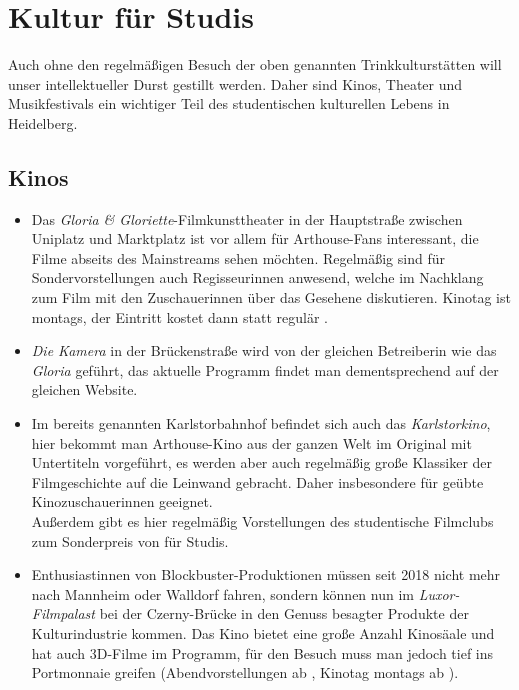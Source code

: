 
\section{Kultur für Studis}

Auch ohne den regelmäßigen Besuch der oben genannten Trinkkulturstätten will unser intellektueller Durst gestillt werden. Daher sind Kinos, Theater und Musikfestivals ein wichtiger Teil des studentischen kulturellen Lebens in Heidelberg.

\subsection{Kinos}
\begin{itemize}
\item Das \emph{Gloria \& Gloriette}-Filmkunsttheater in der Hauptstraße zwischen Uniplatz und Marktplatz ist vor allem für Arthouse-Fans interessant, die Filme abseits des Mainstreams sehen möchten. Regelmäßig sind für Sondervorstellungen auch Regisseurinnen anwesend, welche im Nachklang zum Film mit den Zuschauerinnen über das Gesehene diskutieren. Kinotag ist montags, der Eintritt kostet dann  statt regulär .
\item \emph{Die Kamera} in der Brückenstraße wird von der gleichen Betreiberin wie das \emph{Gloria} geführt, das aktuelle Programm findet man dementsprechend auf der gleichen Website.
\item Im bereits genannten Karlstorbahnhof befindet sich auch das \emph{Karlstorkino}, hier bekommt man Arthouse-Kino aus der ganzen Welt im Original mit Untertiteln vorgeführt, es werden aber auch regelmäßig große Klassiker der Filmgeschichte auf die Leinwand gebracht. Daher insbesondere für geübte Kinozuschauerinnen geeignet.\\
Außerdem gibt es hier regelmäßig Vorstellungen des studentische Filmclubs zum Sonderpreis von  für Studis.
\item Enthusiastinnen von Block\-bus\-ter-Pro\-duk\-tio\-nen müssen seit 2018 nicht mehr nach Mannheim oder Walldorf fahren, sondern können nun im \emph{Luxor-Filmpalast} bei der Czerny-Brücke in den Genuss besagter Produkte der Kulturindustrie kommen. Das Kino bietet eine große Anzahl Kinosäale und hat auch 3D-Filme im Programm, für den Besuch muss man jedoch tief ins Portmonnaie greifen (Abendvorstellungen ab , Kinotag montags ab ).
\end{itemize} 

